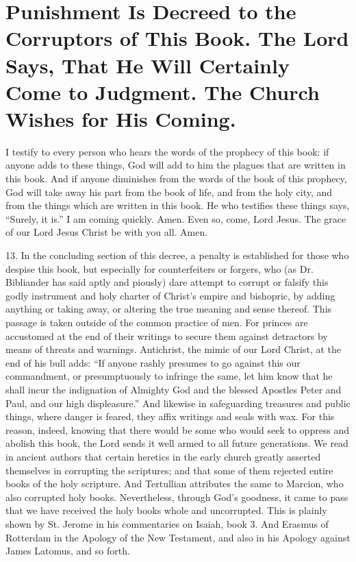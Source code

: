 \chapter[Sermon 101. Punishment Is Decreed to the Corruptors of This Book. The Lord Says, That He Will Certainly Come to Judgment. The Church Wishes for His Coming.]{Punishment Is Decreed to the Corruptors of This Book. The Lord Says, That He Will Certainly Come to Judgment. The Church Wishes for His Coming.}
\label{sermon:101}

I testify to every person who hears the words of the prophecy of this book: if anyone adds to these things, God will add to him the plagues that are written in this book. And if anyone diminishes from the words of the book of this prophecy, God will take away his part from the book of life, and from the holy city, and from the things which are written in this book. He who testifies these things says, “Surely, it is.” I am coming quickly. Amen. Even so, come, Lord Jesus. The grace of our Lord Jesus Christ be with you all. Amen.

13. In the concluding section of this decree, a penalty is established for those who despise this book, but especially for counterfeiters or forgers, who (as Dr. Bibliander has said aptly and piously) dare attempt to corrupt or falsify this godly instrument and holy charter of Christ’s empire and bishopric, by adding anything or taking away, or altering the true meaning and sense thereof. This passage is taken outside of the common practice of men. For princes are accustomed at the end of their writings to secure them against detractors by means of threats and warnings. Antichrist, the mimic of our Lord Christ, at the end of his bull adds: “If anyone rashly presumes to go against this our commandment, or presumptuously to infringe the same, let him know that he shall incur the indignation of Almighty God and the blessed Apostles Peter and Paul, and our high displeasure.” And likewise in safeguarding treasures and public things, where danger is feared, they affix writings and seals with wax. For this reason, indeed, knowing that there would be some who would seek to oppress and abolish this book, the Lord sends it well armed to all future generations. We read in ancient authors that certain heretics in the early church greatly asserted themselves in corrupting the scriptures; and that some of them rejected entire books of the holy scripture. And Tertullian attributes the same to Marcion, who also corrupted holy books. Nevertheless, through God’s goodness, it came to pass that we have received the holy books whole and uncorrupted. This is plainly shown by St. Jerome in his commentaries on Isaiah, book 3. And Erasmus of Rotterdam in the Apology of the New Testament, and also in his Apology against James Latomus, and so forth.

